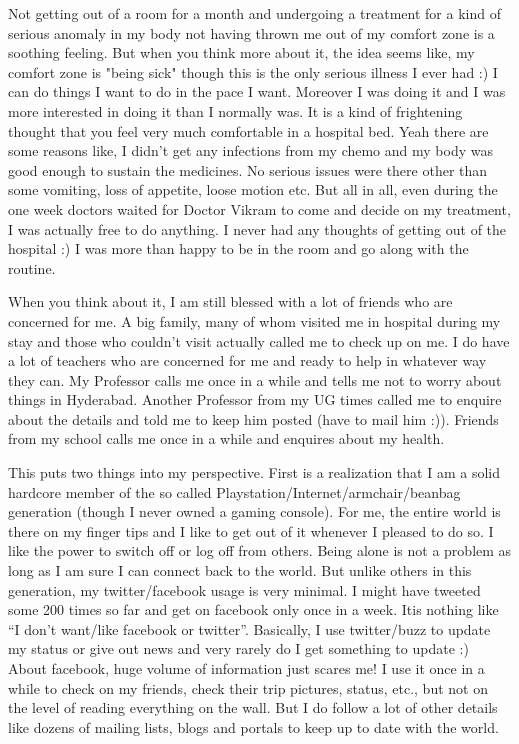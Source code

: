 {Not getting out of a room for a month and undergoing a treatment for a kind of serious anomaly in my body not 
having thrown me out of my comfort zone is a soothing feeling. But when you think more about it, the idea seems 
like, my comfort zone is "being sick" though this is the only serious illness I ever had :) I can do things I want to 
do in the pace I want. Moreover I was doing it and I was more interested in doing it than I normally was. It is a 
kind of frightening thought that you feel very much comfortable in a hospital bed. Yeah there are some reasons 
like, I didn't get any infections from my chemo and my body was good enough to sustain the medicines. No serious 
issues were there other than some vomiting, loss of appetite, loose motion etc. But all in all, even during the one 
week doctors waited for Doctor Vikram to come and decide on my treatment, I was actually free to do anything. 
I never had any thoughts of getting out of the hospital :) I was more than happy to be in the room and go along 
with the routine. 

When you think about it, I am still blessed with a lot of friends who are concerned for me. A big family, many of 
whom visited me in hospital during my stay and those who couldn't visit actually called me to check up on me. 
I do have a lot of teachers who are concerned for me and ready to help in whatever way they can. My Professor 
calls me once in a while and tells me not to worry about things in Hyderabad. Another Professor from my UG times 
called me to enquire about the details and told me to keep him posted (have to mail him :)). Friends from my 
school calls me once in a while and enquires about my health.

This puts two things into my perspective. First is a realization that I am a solid hardcore member of the so called 
Playstation/Internet/armchair/beanbag generation (though I never owned a gaming console). For me, the entire 
world is there on my finger tips and I like to get out of it whenever I pleased to do so. I like the power to switch off 
or log off from others. Being alone is not a problem as long as I am sure I can connect back to the world. But unlike 
others in this generation, my twitter/facebook usage is very minimal. I might have tweeted some 200 times so far 
and get on facebook only once in a week. Itis nothing like ``I don't want/like facebook or twitter''. Basically, I use 
twitter/buzz to update my status or give out news and very rarely do I get something to update :) About facebook, 
huge volume of information just scares me! I use it once in a while to check on my friends, check their trip pictures, 
status, etc., but not on the level of reading everything on the wall. But I do follow a lot of other details like dozens 
of mailing lists, blogs and portals to keep up to date with the world. 

}
